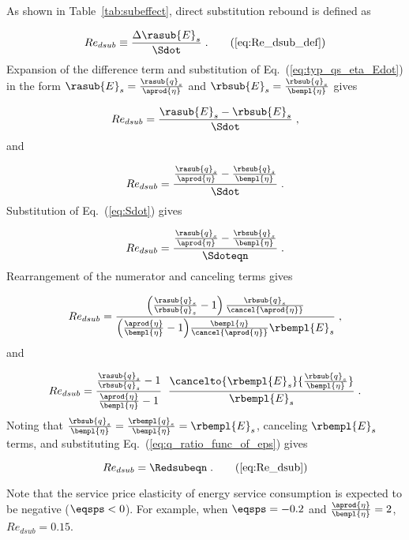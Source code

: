 As shown in Table~\ref{tab:subeffect}, direct substitution rebound is defined as

\begin{equation}
  Re_{dsub} \equiv \frac{\Delta \rasub{E}_s}{\Sdot} \; . \tag{\ref{eq:Re_dsub_def}}
\end{equation}
%
Expansion of the difference term and
substitution of Eq.~(\ref{eq:typ_qs_eta_Edot}) in the form
$\rasub{E}_s = \frac{\rasub{q}_s}{\aprod{\eta}}$
and
$\rbsub{E}_s = \frac{\rbsub{q}_s}{\bempl{\eta}}$
gives

\begin{equation}
   Re_{dsub} = \frac{\rasub{E}_s - \rbsub{E}_s}{\Sdot} \; ,
\end{equation}
%
and

\begin{equation}
     Re_{dsub} = \frac{\frac{\rasub{q}_s}{\aprod{\eta}} - \frac{\rbsub{q}_s}{\bempl{\eta}}}{\Sdot} \; .
\end{equation}
%
Substitution of Eq.~(\ref{eq:Sdot}) gives

\begin{equation}
  Re_{dsub} = \frac{\frac{\rasub{q}_s}{\aprod{\eta}} - \frac{\rbsub{q}_s}{\bempl{\eta}}}
              {\Sdoteqn} \; .
\end{equation}
%
Rearrangement of the numerator and canceling terms gives

\begin{equation}
  Re_{dsub} = \frac{\left( \frac{\rasub{q}_s}{\rbsub{q}_s} - 1 \right) \frac{\rbsub{q}_s}{\cancel{\aprod{\eta}}} }
              {\left( \frac{\aprod{\eta}}{\bempl{\eta}} - 1 \right)\!\frac{\bempl{\eta}}{\cancel{\aprod{\eta}}} \rbempl{E}_s} \; ,
\end{equation}
%
and

\begin{equation}
    Re_{dsub} = \frac{\frac{\rasub{q}_s}{\rbsub{q}_s} - 1}{\frac{\aprod{\eta}}{\bempl{\eta}} - 1} \; \;
                \frac{\cancelto{\rbempl{E}_s}{\frac{\rbsub{q}_s}{\bempl{\eta}}}}{\rbempl{E}_s} \; .
\end{equation}
%
Noting that $\frac{\rbsub{q}_s}{\bempl{\eta}} = \frac{\rbempl{q}_s}{\bempl{\eta}} = \rbempl{E}_s$,
canceling $\rbempl{E}_s$ terms,
and substituting Eq.~(\ref{eq:q_ratio_func_of_eps}) gives

\begin{equation}
  Re_{dsub} = \Redsubeqn \; . \tag{\ref{eq:Re_dsub}}
\end{equation}

Note that the service price elasticity of energy service consumption is
expected to be negative ($\eqsps < 0$).
For example, when $\eqsps = -0.2$ and $\frac{\aprod{\eta}}{\bempl{\eta}} = 2$,
$Re_{dsub} = 0.15$.

